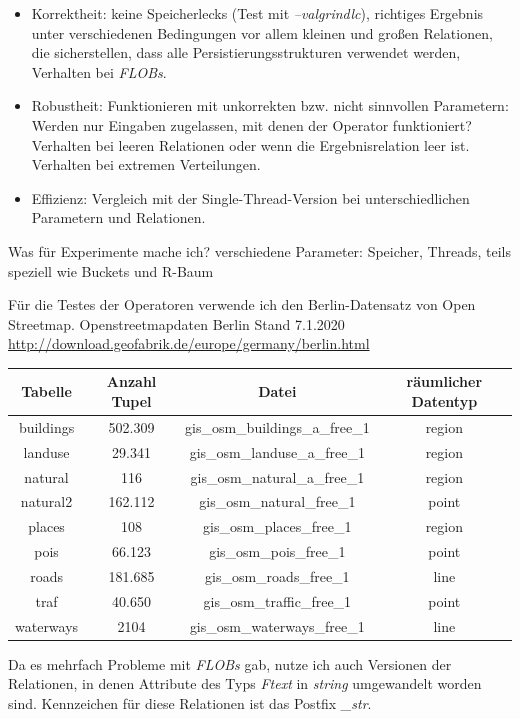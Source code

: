 \documentclass[a4paper,12pt,twoside]{article}
\newcommand{\Fb}[1]{\textit{#1}} %
\begin{document}
\begin{itemize}
	\item Korrektheit: keine Speicherlecks (Test mit \Fb{--valgrindlc}), richtiges Ergebnis unter verschiedenen Bedingungen vor allem kleinen und großen Relationen, die sicherstellen, dass alle Persistierungsstrukturen verwendet werden, Verhalten bei \Fb{FLOBs}.
	\item Robustheit: Funktionieren mit unkorrekten bzw. nicht sinnvollen Parametern: Werden nur Eingaben zugelassen, mit denen der Operator funktioniert? Verhalten bei leeren Relationen oder wenn die Ergebnisrelation leer ist. Verhalten bei extremen Verteilungen.
	\item Effizienz: Vergleich mit der Single-Thread-Version bei unterschiedlichen Parametern und Relationen. 
\end{itemize}

Was für Experimente mache ich?
verschiedene Parameter: Speicher, Threads, teils speziell wie Buckets und R-Baum 


Für die Testes der Operatoren verwende ich den Berlin-Datensatz von Open Streetmap. 
Openstreetmapdaten Berlin Stand 7.1.2020
\url{http://download.geofabrik.de/europe/germany/berlin.html}

\begin{tabular}{|c|c|c|c|}
	\hline 
	Tabelle & Anzahl Tupel & Datei & räumlicher Datentyp  \\ 
	\hline 
	buildings & 502.309 & gis\_osm\_buildings\_a\_free\_1 & region \\ 
	\hline 
	landuse & 29.341 & gis\_osm\_landuse\_a\_free\_1 & region \\ 
	\hline 
	natural & 116 & gis\_osm\_natural\_a\_free\_1 & region \\ 
	\hline 
	natural2 & 162.112 & gis\_osm\_natural\_free\_1 & point \\ 
	\hline
	places & 108 & gis\_osm\_places\_free\_1 & region \\ 
	\hline 
	pois & 66.123 & gis\_osm\_pois\_free\_1  & point \\ 
	\hline 
	roads & 181.685 & gis\_osm\_roads\_free\_1 & line \\ 
	\hline
	traf & 40.650 & gis\_osm\_traffic\_free\_1  & point \\ 
	\hline 
	waterways & 2104 & gis\_osm\_waterways\_free\_1 & line \\ 
	\hline 
\end{tabular}

Da es mehrfach Probleme mit \Fb{FLOBs} gab, nutze ich auch Versionen der Relationen, in denen Attribute des Typs \Fb{Ftext} in \Fb{string} umgewandelt worden sind. Kennzeichen für diese Relationen ist das Postfix \Fb{\_str}.
\end{document}
